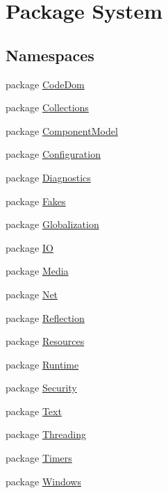 \hypertarget{namespace_system}{\section{Package System}
\label{namespace_system}
}
\subsection*{Namespaces}
\begin{DoxyCompactItemize}
\item 
package \hyperlink{namespace_system_1_1_code_dom}{Code\-Dom}
\item 
package \hyperlink{namespace_system_1_1_collections}{Collections}
\item 
package \hyperlink{namespace_system_1_1_component_model}{Component\-Model}
\item 
package \hyperlink{namespace_system_1_1_configuration}{Configuration}
\item 
package \hyperlink{namespace_system_1_1_diagnostics}{Diagnostics}
\item 
package \hyperlink{namespace_system_1_1_fakes}{Fakes}
\item 
package \hyperlink{namespace_system_1_1_globalization}{Globalization}
\item 
package \hyperlink{namespace_system_1_1_i_o}{I\-O}
\item 
package \hyperlink{namespace_system_1_1_media}{Media}
\item 
package \hyperlink{namespace_system_1_1_net}{Net}
\item 
package \hyperlink{namespace_system_1_1_reflection}{Reflection}
\item 
package \hyperlink{namespace_system_1_1_resources}{Resources}
\item 
package \hyperlink{namespace_system_1_1_runtime}{Runtime}
\item 
package \hyperlink{namespace_system_1_1_security}{Security}
\item 
package \hyperlink{namespace_system_1_1_text}{Text}
\item 
package \hyperlink{namespace_system_1_1_threading}{Threading}
\item 
package \hyperlink{namespace_system_1_1_timers}{Timers}
\item 
package \hyperlink{namespace_system_1_1_windows}{Windows}
\end{DoxyCompactItemize}
